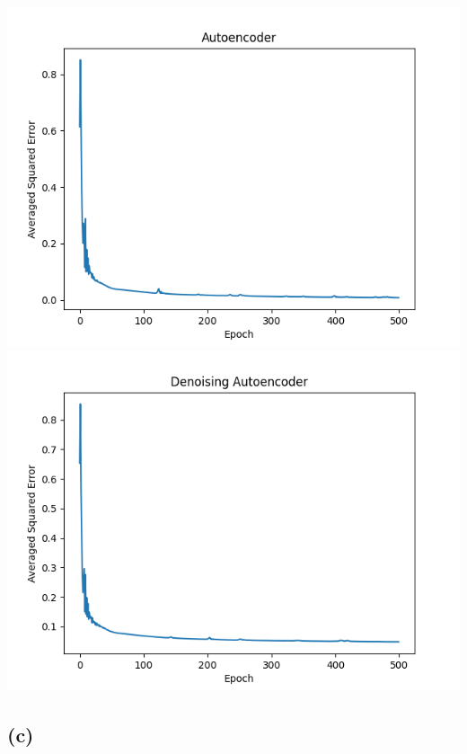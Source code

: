 \includegraphics[width=14cm]{Autoencoder_Error.png}\\
\includegraphics[width=14cm]{Denoising_Autoencoder_Error.png}

\subsection{(c)}

